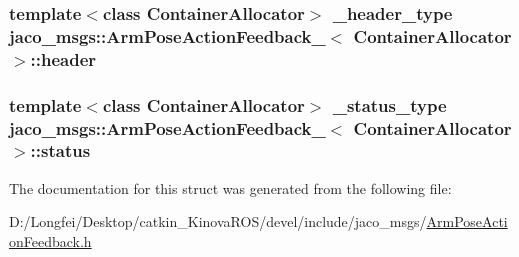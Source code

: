 \subsubsection[{\texorpdfstring{header}{header}}]{\setlength{\rightskip}{0pt plus 5cm}template$<$class Container\+Allocator$>$ {\bf \+\_\+header\+\_\+type} {\bf jaco\+\_\+msgs\+::\+Arm\+Pose\+Action\+Feedback\+\_\+}$<$ Container\+Allocator $>$\+::header}\hypertarget{structjaco__msgs_1_1ArmPoseActionFeedback___af09503192cc1120085e2f8ef58ab0dbb}{}\label{structjaco__msgs_1_1ArmPoseActionFeedback___af09503192cc1120085e2f8ef58ab0dbb}
\subsubsection[{\texorpdfstring{status}{status}}]{\setlength{\rightskip}{0pt plus 5cm}template$<$class Container\+Allocator$>$ {\bf \+\_\+status\+\_\+type} {\bf jaco\+\_\+msgs\+::\+Arm\+Pose\+Action\+Feedback\+\_\+}$<$ Container\+Allocator $>$\+::status}\hypertarget{structjaco__msgs_1_1ArmPoseActionFeedback___a386a2bed5a7ad4dcd6b6135799f9882d}{}\label{structjaco__msgs_1_1ArmPoseActionFeedback___a386a2bed5a7ad4dcd6b6135799f9882d}


The documentation for this struct was generated from the following file\+:\begin{DoxyCompactItemize}
\item 
D\+:/\+Longfei/\+Desktop/catkin\+\_\+\+Kinova\+R\+O\+S/devel/include/jaco\+\_\+msgs/\hyperlink{ArmPoseActionFeedback_8h}{Arm\+Pose\+Action\+Feedback.\+h}\end{DoxyCompactItemize}
